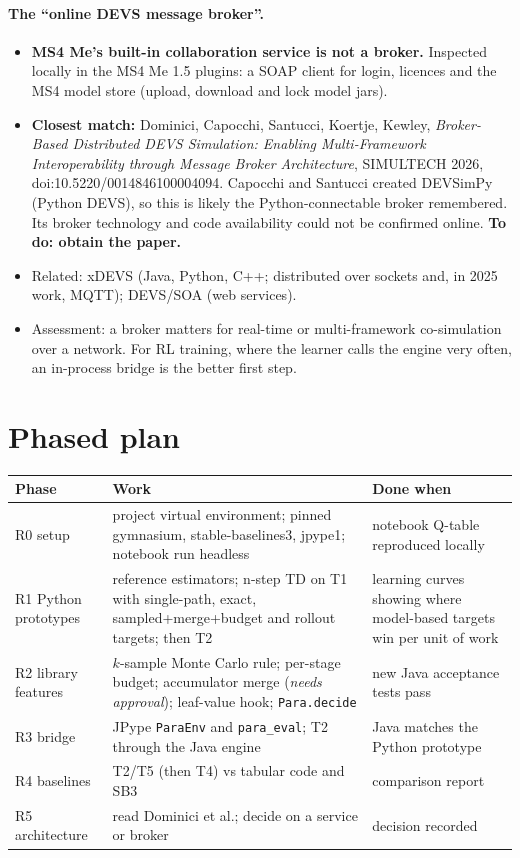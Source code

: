 \documentclass[11pt]{article}
\newcommand{\code}[1]{\texttt{#1}}
\begin{document}
\paragraph{The ``online DEVS message broker''.}
\begin{itemize}
\item \textbf{MS4 Me's built-in collaboration service is not a broker.} Inspected locally in the MS4 Me 1.5 plugins: a
  SOAP client for login, licences and the MS4 model store (upload, download and lock model jars).
\item \textbf{Closest match:} Dominici, Capocchi, Santucci, Koertje, Kewley, \emph{Broker-Based Distributed DEVS
  Simulation: Enabling Multi-Framework Interoperability through Message Broker Architecture}, SIMULTECH 2026,
  doi:10.5220/0014846100004094. Capocchi and Santucci created DEVSimPy (Python DEVS), so this is likely the
  Python-connectable broker remembered. Its broker technology and code availability could not be confirmed online.
  \textbf{To do: obtain the paper.}
\item Related: xDEVS (Java, Python, C++; distributed over sockets and, in 2025 work, MQTT); DEVS/SOA (web services).
\item Assessment: a broker matters for real-time or multi-framework co-simulation over a network. For RL training,
  where the learner calls the engine very often, an in-process bridge is the better first step.
\end{itemize}

\section{Phased plan}
\begin{center}
\small
\begin{tabularx}{\linewidth}{@{}p{2.3cm} Y p{4.2cm}@{}}
\toprule
\textbf{Phase} & \textbf{Work} & \textbf{Done when}\\
\midrule
R0 setup & project virtual environment; pinned gymnasium, stable-baselines3, jpype1; notebook run headless & notebook Q-table reproduced locally\\
R1 Python prototypes & reference estimators; n-step TD on T1 with single-path, exact, sampled+merge+budget and rollout targets; then T2 & learning curves showing where model-based targets win per unit of work\\
R2 library features & $k$-sample Monte Carlo rule; per-stage budget; accumulator merge (\emph{needs approval}); leaf-value hook; \code{Para.decide} & new Java acceptance tests pass\\
R3 bridge & JPype \code{ParaEnv} and \code{para\_eval}; T2 through the Java engine & Java matches the Python prototype\\
R4 baselines & T2/T5 (then T4) vs tabular code and SB3 & comparison report\\
R5 architecture & read Dominici et al.; decide on a service or broker & decision recorded\\
\bottomrule
\end{tabularx}
\end{center}
\end{document}
